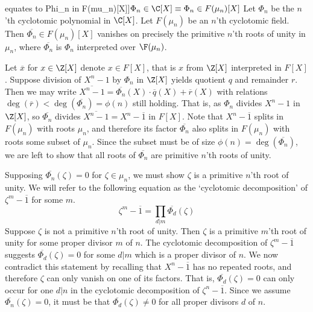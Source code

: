 \begin{theorem}[Phi_n in C[X] equates to Phi_n in F(mu_n)[X]]{$\Phi_n\in\C[X]\equiv\Phi_n\in F(\mu_n)[X]$}
    Let $\Phi_n$ be the $n$'th cyclotomic polynomial in $\C[X]$.
    Let $F(\mu_n)$ be an $n$'th cyclotomic field.
    Then $\overline{\Phi_n}\in F(\mu_n)[X]$ vanishes on precisely the primitive $n$'th roots of unity in $\mu_n$, where $\overline{\Phi_n}$ is $\Phi_n$ interpreted over $\F(\mu_n)$.

    \proof
    Let $\overline{x}$ for $x\in\Z[X]$ denote $x\in F[X]$, that is $x$ from $\Z[X]$ interpreted in $F[X]$.
    Suppose division of $X^n-1$ by $\Phi_n$ in $\Z[X]$ yields quotient $q$ and remainder $r$.
    Then we may write $\overline{X^n-1} = \overline{\Phi_n}(X)\cdot\overline{q}(X)+\overline{r}(X)$ with relations $\deg(\overline{r})<\deg(\overline{\Phi_n})=\phi(n)$ still holding.
    That is, as $\Phi_n$ divides $X^n-1$ in $\Z[X]$, so $\overline{\Phi_n}$ divides $\overline{X^n-1}=X^n-\overline{1}$ in $F[X]$.
    Note that $X^n-\overline{1}$ splits in $F(\mu_n)$ with roots $\mu_n$, and therefore its factor $\overline{\Phi_n}$ also splits in $F(\mu_n)$ with roots some subset of $\mu_n$.
    Since the subset must be of size $\phi(n)=\deg(\overline{\Phi_n})$, we are left to show that all roots of $\overline{\Phi_n}$ are primitive $n$'th roots of unity.

    Supposing $\overline{\Phi_n}(\zeta)=0$ for $\zeta\in\mu_n$, we must show $\zeta$ is a primitive $n$'th root of unity.
    We will refer to the following equation as the `cyclotomic decomposition' of $\zeta^m-\overline{1}$ for some $m$.
    \begin{equation}
        \zeta^m-\overline{1} = \prod_{d|m} \overline{\Phi_d}(\zeta)
    \end{equation}
    Suppose $\zeta$ is not a primitive $n$'th root of unity.
    Then $\zeta$ is a primitive $m$'th root of unity for some proper divisor $m$ of $n$.
    The cyclotomic decomposition of $\zeta^m-\overline{1}$ suggests $\overline{\Phi_d}(\zeta)=0$ for some $d|m$ which is a proper divisor of $n$.
    We now contradict this statement by recalling that $X^n-\overline{1}$ has no repeated roots, and therefore $\zeta$ can only vanish on one of its factors.
    That is, $\overline{\Phi_d}(\zeta)=0$ can only occur for one $d|n$ in the cyclotomic decomposition of $\zeta^n-\overline{1}$.
    Since we assume $\overline{\Phi_n}(\zeta)=0$, it must be that $\overline{\Phi_d}(\zeta)\neq0$ for all proper divisors $d$ of $n$.
\end{theorem}


